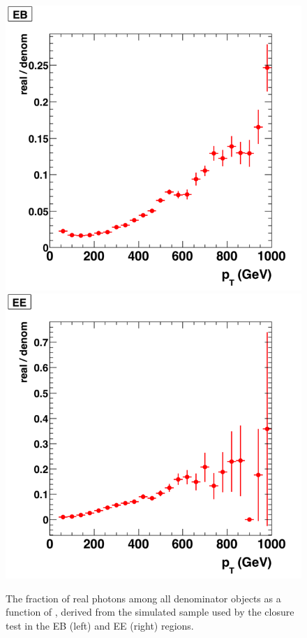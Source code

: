 \begin{figure}[!htbp]
  \centering
  \includegraphics[scale=0.35]{figures/pt_denominator_real_EB.png}
  \includegraphics[scale=0.35]{figures/pt_denominator_real_EE.png}
  \caption{The fraction of real photons among all denominator objects as a function of \pt, derived from the simulated sample used by the closure test in the EB (left) and EE (right) regions.}
  \label{fig:denom_cont}
\end{figure}



